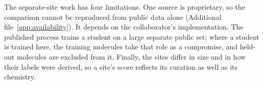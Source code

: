The separate-site work has four limitations. One source is proprietary, so the comparison cannot be reproduced from public data alone (Additional file~\ref{app:availability}). It depends on the collaborator's implementation. The published process trains a student on a large separate public set; where a student is trained here, the training molecules take that role as a compromise, and held-out molecules are excluded from it. Finally, the sites differ in size and in how their labels were derived, so a site's score reflects its curation as well as its chemistry.



